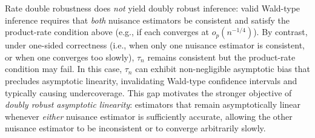 \documentclass[11pt]{article}
\theoremstyle{plain}
\begin{document}
Rate double robustness does \emph{not} yield doubly robust inference: valid
Wald-type inference requires that \emph{both} nuisance estimators be consistent
and satisfy the product-rate condition above (e.g., if each converges at
\(o_p(n^{-1/4})\)). By contrast, under one-sided correctness (i.e., when only one
nuisance estimator is consistent, or when one converges too slowly), \(\tau_n\)
remains consistent but the product-rate condition may fail. In this case,
\(\tau_n\) can exhibit non-negligible asymptotic bias that precludes asymptotic
linearity, invalidating Wald-type confidence intervals and typically causing
undercoverage. This gap motivates the stronger objective of \emph{doubly robust
asymptotic linearity}: estimators that remain asymptotically linear
whenever \emph{either} nuisance estimator is sufficiently accurate, allowing the
other nuisance estimator to be inconsistent or to converge arbitrarily slowly.
\end{document}
